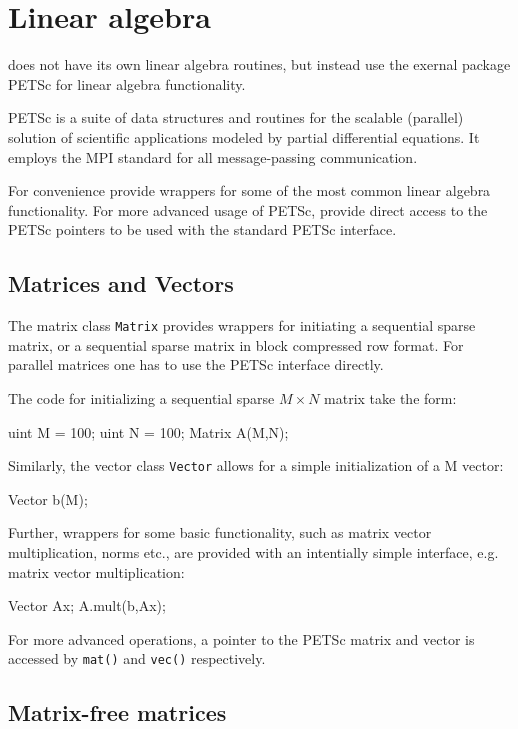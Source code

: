 \chapter{Linear algebra}

\dolfin{} does not have its own linear algebra routines, 
but instead use the exernal package PETSc \cite{www:petsc} 
for linear algebra functionality.    

PETSc is a suite of data structures and routines for the scalable 
(parallel) solution of scientific applications modeled by partial 
differential equations. 
It employs the MPI standard for all message-passing communication.  

For convenience \dolfin{} provide wrappers for some of the most 
common linear algebra functionality. For more advanced usage of 
PETSc, \dolfin{} provide direct access to the PETSc pointers 
to be used with the standard PETSc interface. 

\section{Matrices and Vectors}

The matrix class \texttt{Matrix} provides wrappers for initiating a 
sequential sparse matrix, or a sequential sparse matrix in 
block compressed row format. For parallel matrices one has to use 
the PETSc interface directly. 

The code for initializing a sequential sparse $M\times N$ matrix 
take the form: 
%
\begin{code}
uint M = 100; 
uint N = 100; 
Matrix A(M,N);
\end{code}

Similarly, the vector class \texttt{Vector} allows for a simple 
initialization of a M vector:  
%
\begin{code}
Vector b(M);
\end{code}

Further, wrappers for some basic functionality, such as matrix vector 
multiplication, norms etc., are provided with an intentially simple interface, 
e.g. matrix vector multiplication: 
%
\begin{code}
Vector Ax;
A.mult(b,Ax);
\end{code} 

For more advanced operations, a pointer to the PETSc matrix and vector is 
accessed by \texttt{mat()} and \texttt{vec()} respectively. 

\section{Matrix-free matrices}

